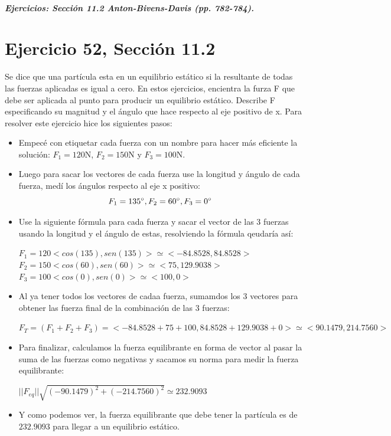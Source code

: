 \documentclass[11pt,letterpaper]{article}
\begin{document}
\subparagraph{Ejercicios: Sección 11.2 Anton-Bivens-Davis (pp. 782-784).}

\section{Ejercicio 52, Sección 11.2}
Se dice que una partícula esta en un equilibrio estático si la resultante de todas las fuerzas 
aplicadas es igual a cero. En estos ejercicios, encientra la furza F que debe ser aplicada al punto para producir un equilibrio estático. Describe F especificando su magnitud y el ángulo que hace respecto al eje positivo de x. 
Para resolver este ejercicio hice los siguientes pasos:
\begin{itemize}
    \item Empecé con etiquetar cada fuerza con un nombre para hacer más eficiente la solución: $F_1 = 120$N, $F_2 = 150$N y $F_3 = 100$N.
    \item Luego para sacar los vectores de cada fuerza use la longitud y ángulo de cada fuerza, medí los ángulos respecto al eje x positivo:
    \begin{equation*}
    F_1 = 135\degree, F_2 = 60\degree, F_3 = 0\degree        
    \end{equation*}
    \item Use la siguiente fórmula para cada fuerza y sacar el vector de las 3 fuerzas usando la longitud y el ángulo de estas, resolviendo la fórmula qeudaría así:
    \begin{center}
        $F_1 = 120<cos(135), sen(135)> \simeq <-84.8528, 84.8528>$
        $F_2 = 150<cos(60), sen(60)> \simeq <75, 129.9038>$
        $F_3 = 100<cos(0), sen(0)> \simeq <100, 0>$
    
    \end{center}
    \item Al ya tener todos los vectores de cadaa fuerza, sumamdos los 3 vectores para obtener las fuerza final de la combinación de las 3 fuerzas:
    \begin{center}
        $F_T = (F_1 + F_2 + F_3) = <-84.8528 + 75 + 100, 84.8528 + 129.9038 + 0> \simeq <90.1479, 214.7560>  $ 
    \end{center}
    \item Para finalizar, calculamos la fuerza equilibrante en forma de vector al pasar la suma de las fuerzas como negativas y sacamos su norma para medir la fuerza equilibrante:
    \begin{center}
        $||F_{eq}|| \sqrt{(-90.1479)^{2} + (-214.7560)^{2}} \simeq 232.9093 $
    \end{center}
    \item Y como podemos ver, la fuerza equilibrante que debe tener la partícula es de $232.9093$ para llegar a un equilibrio estático.
\end{itemize}
\end{document}

